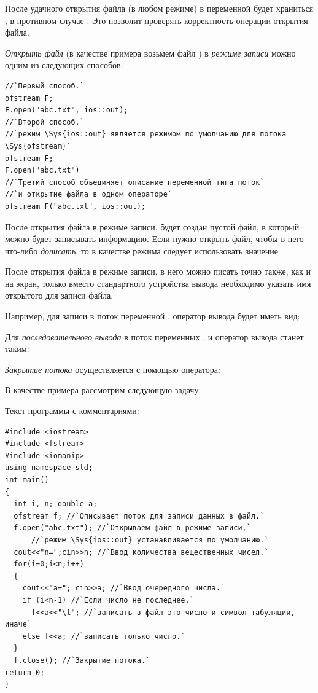 После удачного открытия файла (в любом режиме) в переменной  будет храниться
, в противном случае . Это позволит проверять корректность операции
открытия файла.

\emph{Открыть файл} (в качестве примера возьмем файл ) в \emph{режиме
записи} можно одним из следующих способов:
\begin{lstlisting}
//`Первый способ.`
ofstream F;			
F.open("abc.txt", ios::out);
//`Второй способ,` 
//`режим \Sys{ios::out} является режимом по умолчанию для потока \Sys{ofstream}`
ofstream F; 
F.open("abc.txt")
//`Третий способ объединяет описание переменной типа поток` 
//`и открытие файла в одном операторе`
ofstream F("abc.txt", ios::out);
\end{lstlisting}

После открытия файла в режиме записи, будет создан пустой файл, в который можно будет записывать информацию. Если нужно
открыть файл, чтобы в него что-либо \emph{дописать}, то в качестве режима следует использовать
значение .

После открытия файла в режиме записи, в него можно писать точно также, как и на экран, только вместо стандартного
устройства вывода  необходимо указать имя открытого для записи файла.

Например, для записи в поток  переменной , оператор вывода будет иметь вид:


Для \emph{последовательного вывода} в поток  переменных ,
 и  оператор вывода станет таким:


\emph{Закрытие потока} осуществляется с помощью оператора:


В качестве примера рассмотрим следующую задачу.


Текст программы с комментариями:
\begin{lstlisting}
#include <iostream>
#include <fstream>
#include <iomanip>
using namespace std;
int main()
{
  int i, n; double a;
  ofstream f; //`Описывает поток для записи данных в файл.`
  f.open("abc.txt"); //`Открываем файл в режиме записи,`
      //`режим \Sys{ios::out} устанавливается по умолчанию.`
  cout<<"n=";cin>>n; //`Ввод количества вещественных чисел.`
  for(i=0;i<n;i++)
  {
    cout<<"a="; cin>>a; //`Ввод очередного числа.`
    if (i<n-1) //`Если число не последнее,`
      f<<a<<"\t"; //`записать в файл это число и символ табуляции, иначе`
    else f<<a; //`записать только число.`
  }
  f.close(); //`Закрытие потока.`
return 0;
}
\end{lstlisting}


